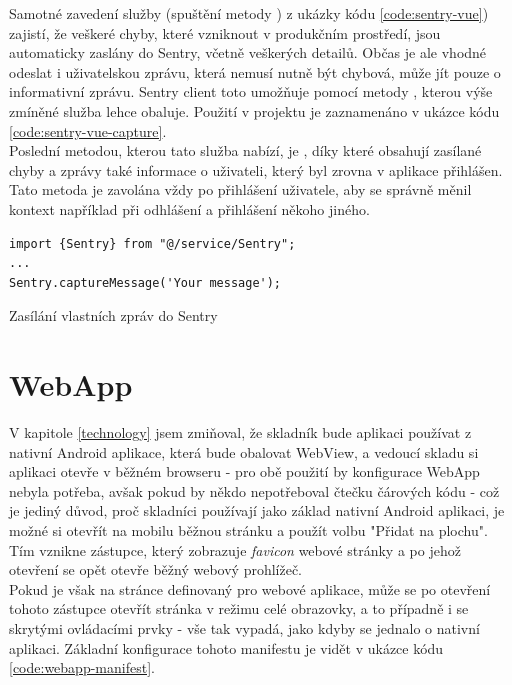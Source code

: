 Samotné zavedení služby (spuštění metody ) z ukázky kódu \ref{code:sentry-vue}) zajistí, že veškeré chyby, které vzniknout v produkčním prostředí, jsou automaticky zaslány do Sentry, včetně veškerých detailů. Občas je ale vhodné odeslat i uživatelskou zprávu, která nemusí nutně být chybová, může jít pouze o informativní zprávu. Sentry client toto umožňuje pomocí metody , kterou výše zmíněné služba lehce obaluje. Použití v projektu je zaznamenáno v ukázce kódu \ref{code:sentry-vue-capture}.\\
Poslední metodou, kterou tato služba nabízí, je , díky které obsahují zasílané chyby a zprávy také informace o uživateli, který byl zrovna v aplikace přihlášen. Tato metoda je zavolána vždy po přihlášení uživatele, aby se správně měnil kontext například při odhlášení a přihlášení někoho jiného.

\begin{listing}[H]
\begin{verbatim}
import {Sentry} from "@/service/Sentry";
...
Sentry.captureMessage('Your message');
\end{verbatim}
\caption{Zasílání vlastních zpráv do Sentry} \label{code:sentry-vue-capture}
\end{listing}


\section{WebApp}

V kapitole \ref{technology} jsem zmiňoval, že skladník bude aplikaci používat z nativní Android aplikace, která bude obalovat WebView, a vedoucí skladu si aplikaci otevře v běžném browseru - pro obě použití by konfigurace WebApp nebyla potřeba, avšak pokud by někdo nepotřeboval čtečku čárových kódu - což je jediný důvod, proč skladníci používají jako základ nativní Android aplikaci, je možné si otevřít na mobilu běžnou stránku a použít volbu "Přidat na plochu". Tím vznikne zástupce, který zobrazuje \emph{favicon} webové stránky a po jehož otevření se opět otevře běžný webový prohlížeč.\\
Pokud je však na stránce definovaný  pro webové aplikace, může se po otevření tohoto zástupce otevřít stránka v režimu celé obrazovky, a to případně i se skrytými ovládacími prvky - vše tak vypadá, jako kdyby se jednalo o nativní aplikaci. Základní konfigurace tohoto manifestu je vidět v ukázce kódu \ref{code:webapp-manifest}.

